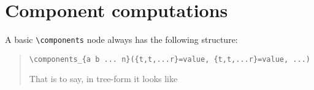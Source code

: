 \section{Component computations}

A basic \verb|\components| node always has the following structure:

\begin{quote}
\begin{verbatim}
\components_{a b ... n}({t,t,...r}=value, {t,t,...r}=value, ...)
\end{verbatim}
That is to say, in tree-form it looks like

\end{quote}
